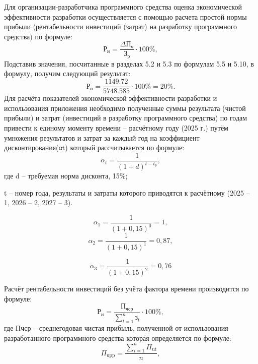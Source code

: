 Для организации-разработчика программного средства оценка экономической эффективности разработки осуществляется с помощью расчета простой нормы прибыли (рентабельности инвестиций (затрат) на разработку программного средства) по формуле:
\begin{equation}
	\mathrm{Р_{и}} = \frac{\Delta 	\mathrm{П_{ч}}}{\mathrm{З_{р}}} \cdot 100\%,
\end{equation}
Подставив значения, посчитанные в разделах 5.2 и 5.3 по формулам 5.5 и 5.10, в формулу, получим следующий результат:
\[
\mathrm{Р_{и}} = \frac{1149.72}{5748.585} \cdot 100\% = 20\%.
\]
Для расчёта показателей экономической эффективности разработки и использования приложения необходимо полученные суммы результата (чистой прибыли) и затрат (инвестиций в разработку программного средства) по годам привести к единому моменту времени – расчётному году (2025 г.) путём умножения результатов и затрат за каждый год на коэффициент дисконтирования(αt) который рассчитывается по формуле:
\begin{equation}
	\alpha_t = \frac{1}{(1 + d)^{t - t_p}},
\end{equation}
где d – требуемая норма дисконта, 15\%;

t – номер года, результаты и затраты которого приводятся к расчётному (2025 – 1, 2026 – 2, 2027 – 3).

\[
\alpha_1 = \frac{1}{(1+0{,}15)^0} = 1,
\]
\[
\alpha_2 = \frac{1}{(1+0{,}15)^1} = 0{,}87,
\]

\[
\alpha_3 = \frac{1}{(1+0{,}15)^2} = 0{,}76
\]

Расчёт рентабельности инвестиций без учёта фактора времени производится по формуле:
\begin{equation}
	\mathrm{Р_{и}} = \frac{\mathrm{П_{чср}}}{\sum_{t=1}^{n} \text{з}_t} \cdot 100\%,
\end{equation}
где Пчср – среднегодовая чистая прибыль, полученной от использования разработанного программного средства которая определяется по формуле:
\begin{equation}
	\Pi_{\mathrm{upp}} = \frac{\sum_{i=1}^{n} \Pi_{\mathrm{ut}}}{n},
\end{equation}
\newpage